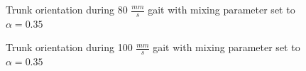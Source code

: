 				\begin{figure}[!h]
					\centering
					\caption{Trunk orientation during 80 $\frac{mm}{s}$ gait with mixing  parameter set to $\alpha = 0.35$}
					\label{fig::narx80_a35}
				\end{figure}
				\begin{figure}[!h]
					\centering
					\caption{Trunk orientation during 100 $\frac{mm}{s}$ gait with mixing parameter set to $\alpha = 0.35$} 
					\label{fig::narx100_a35}
				\end{figure}